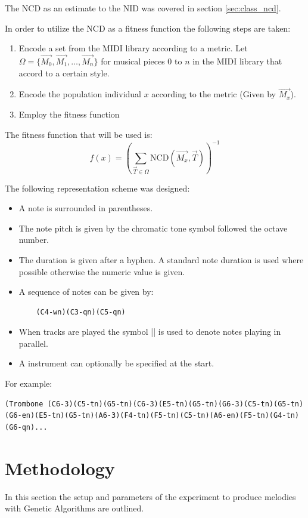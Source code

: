 The \ac{NCD} as an estimate to the \ac{NID} was covered in section \ref{sec:class_ncd}.

In order to utilize the \ac{NCD} as a fitness function the following steps are taken:
\begin{enumerate}
\item Encode a set from the \ac{MIDI} library according to a metric. Let $\Omega = \{\vec{M_0}, \vec{M_1}, \ldots, \vec{M_n}\}$ for musical pieces $0$ to $n$ in the \ac{MIDI} library that accord to a certain style.
\item Encode the population individual $x$ according to the metric (Given by $\vec{M_x}$).
\item Employ the fitness function
\end{enumerate}

The fitness function that will be used is:
\[f(x) =  \left(\sum_{\vec{T}\in\Omega} \text{NCD}(\vec{M_x}, \vec{T}) \right)^{-1}\]

The following representation scheme was designed:
\begin{itemize}
\item A note is surrounded in parentheses.
\item The note pitch is given by the chromatic tone symbol followed the octave number.
\item The duration is given after a hyphen. A standard note duration is used where possible otherwise the numeric value is given.
\item 
A sequence of notes can be given by: 
	\begin{lstlisting} 
	(C4-wn)(C3-qn)(C5-qn) 
	\end{lstlisting}
\item When tracks are played the symbol || is used to denote notes playing in parallel.
\item A instrument can optionally be specified at the start.
\end{itemize}

For example:
\begin{lstlisting}
(Trombone (C6-3)(C5-tn)(G5-tn)(C6-3)(E5-tn)(G5-tn)(G6-3)(C5-tn)(G5-tn)(G6-en)(E5-tn)(G5-tn)(A6-3)(F4-tn)(F5-tn)(C5-tn)(A6-en)(F5-tn)(G4-tn)(G6-qn)...
\end{lstlisting}


\section{Methodology}
In this section the setup and parameters of the experiment to produce melodies with Genetic Algorithms are outlined.

